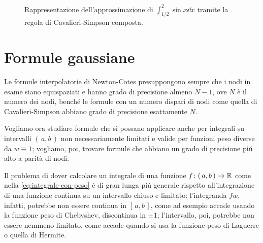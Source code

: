 	\begin{figure}[tpb]
		\centering
		
		\caption{Rappresentazione dell'approssimazione di \(\int_{1 / 2}^2 \sin x \dd{x}\) tramite la regola di Cavalieri-Simpson composta.}
	\end{figure}
	
\section{Formule gaussiane}
	
	\noindent Le formule interpolatorie di Newton-Cotes presuppongono sempre che i nodi in esame siano equispaziati e hanno grado di precisione almeno \(N - 1\), ove \(N\) è il numero dei nodi, benché le formule con un numero dispari di nodi come quella di Cavalieri-Simpson abbiano grado di precisione esattamente \(N\).
	
	Vogliamo ora studiare formule che si possano applicare anche per integrali su intervalli \((\, a, b \,)\) non necessariamente limitati e valide per funzioni peso diverse da \(w \equiv 1\); vogliamo, poi, trovare formule che abbiano un grado di precisione piú alto a parità di nodi.
	
	Il problema di dover calcolare un integrale di una funzione \(f \colon (\, a, b \,) \to \mathbb{R}\) come nella \eqref{eq:integrale-con-peso} è di gran lunga piú generale rispetto all'integrazione di una funzione continua su un intervallo chiuso e limitato: l'integranda \(f w\), infatti, potrebbe non essere continua in \([\, a, b \,]\), come ad esempio accade usando la funzione peso di Chebyshev, discontinua in \(\pm 1\); l'intervallo, poi, potrebbe non essere nemmeno limitato, come accade quando si usa la funzione peso di Laguerre o quella di Hermite.
	

